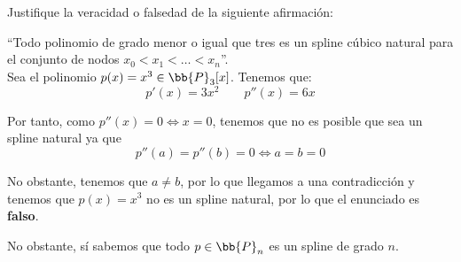 \begin{ejercicio}
    Justifique la veracidad o falsedad de la siguiente afirmación:

    ``Todo polinomio de grado menor o igual que tres es un spline cúbico natural para el conjunto de nodos $x_0 < x_1 < \dots < x_n$''.\\

    Sea el polinomio $p(x)=x^3\in \bb{P}_3[x]$. Tenemos que:
    \begin{equation*}
        p'(x)=3x^2 \qquad p''(x)=6x
    \end{equation*}

    Por tanto, como $p''(x)=0 \Longleftrightarrow x=0$, tenemos que no es posible que sea un spline natural ya que $$p''(a)=p''(b)=0 \Longleftrightarrow a=b=0$$

    No obstante, tenemos que $a\neq b$, por lo que llegamos a una contradicción y tenemos que $p(x)=x^3$ no es un spline natural, por lo que el enunciado es \textbf{falso}.

    No obstante, sí sabemos que todo $p\in \bb{P}_n$ es un spline de grado $n$.
\end{ejercicio}


